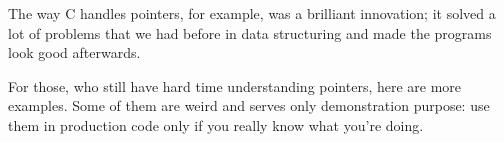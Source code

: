 \myindex{\CLanguageElements!\Pointers}
\label{label_pointers}

\epigraph{The way C handles pointers, for example, was a brilliant innovation;
it solved a lot of problems that we had before in data structuring and
made the programs look good afterwards.}
{}

For those, who still have hard time understanding \CCpp pointers, here are more examples.
Some of them are weird and serves only demonstration purpose:
use them in production code only if you really know what you're doing.







